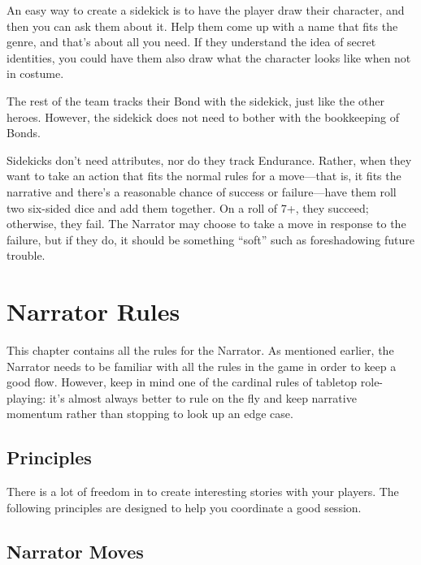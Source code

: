 \documentclass[letterpaper]{report}
\begin{document}
An easy way to create a sidekick is to have the player draw their
character, and then you can ask them about it. Help them come up
with a name that fits the genre, and that's about all you need.
If they understand the idea of secret identities, you could have
them also draw what the character looks like when not in costume.

The rest of the team tracks their Bond with the sidekick, just like
the other heroes. However, the sidekick does not need to bother with
the bookkeeping of Bonds.

Sidekicks don't need attributes, nor do they track Endurance.
Rather, when they want to take an action that fits the normal
rules for a move---that is, it fits the narrative and
there's a reasonable chance of success or failure---have them
roll two six-sided dice and add them together.
On a roll of 7+, they succeed; otherwise, they fail.
The Narrator may choose to take a move in response to the failure,
but if they do, it should be something ``soft'' such as foreshadowing
future trouble.

\chapter{Narrator Rules}

This chapter contains all the rules for the Narrator.
As mentioned earlier, the Narrator needs to be familiar with all
the rules in the game in order to keep a good flow.
However, keep in mind one of the cardinal rules of tabletop
role-playing: it's almost always better to rule on the fly and keep
narrative momentum rather than stopping to look up an edge case.


\section{Principles}

There is a lot of freedom in \kapow{} to create interesting stories
with your players. The following principles are designed to help
you coordinate a good session.

\newenvironment{principle}[2]
{\subsection*{#1} #2}
{}



\section{Narrator Moves}
\label{sec:narrator-moves}
\end{document}

